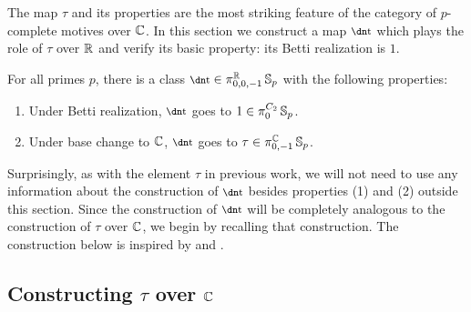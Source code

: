 The map $\tau$ and its properties are the most striking feature of the category of $p$-complete motives over $\mathbb{C}$. In this section we construct a map $\ta$ which plays the role of $\tau$ over $\mathbb{R}$ and verify its basic property: its Betti realization is $1$. 

\begin{thm}\label{thm:ta}
  For all primes $p$, there is a class $\ta \in \pi_{0,0,-1} ^\R \Ss_p$ with the following properties:
  \begin{enumerate}
    \item Under Betti realization, $\ta$ goes to $1 \in \pi_{0} ^{C_2} \operatorname{\mathbb{S}}_p$.
    \item Under base change to $\mathbb{C}$, $\ta$ goes to $\tau \in \pi_{0,-1} ^{\mathbb{C}} \operatorname{\mathbb{S}}_p$.
  \end{enumerate}
\end{thm}

Surprisingly, as with the element $\tau$ in previous work, we will not need to use any information about the construction of $\ta$ besides properties (1) and (2) outside this section.
Since the construction of $\ta$ will be completely analogous to the construction of $\tau$ over $\mathbb{C}$, we begin by recalling that construction. The construction below is inspired by \cite[Remark on p. 22]{HKO} and \cite[Section 4]{TomEtaleII}.


\subsection{Constructing $\tau$ over $\mathbb{C}$}\

